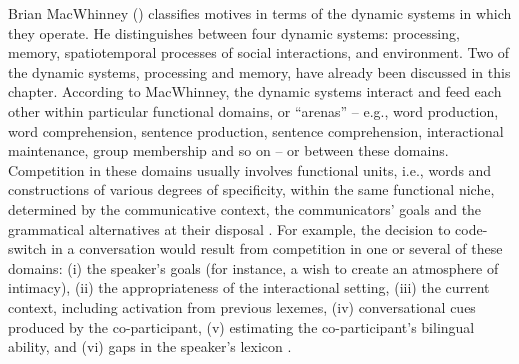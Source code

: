 Brian MacWhinney (\citeyear[][368--370]{macwhinney2014}) classifies motives in terms of the dynamic systems in which they operate. He distinguishes between four dynamic systems: processing, memory, spatiotemporal processes of social interactions, and environment. Two of the dynamic systems, processing and memory, have already been discussed in this chapter. According to MacWhinney, the dynamic systems interact and feed each other within particular functional domains, or “arenas” -- e.g., word production, word comprehension, sentence production, sentence comprehension, interactional maintenance, group membership and so on -- or between these domains. Competition in these domains usually involves functional units, i.e., words and constructions of various degrees of specificity, within the same functional niche, determined by the communicative context, the communicators' goals and the grammatical alternatives at their disposal \citep[][266]{dubois2014}. For example, the decision to code-switch in a conversation would result from competition in one or several of these domains: ({i}) the speaker's goals (for instance, a wish to create an atmosphere of intimacy), ({ii}) the appropriateness of the interactional setting, ({iii}) the current context, including activation from previous lexemes, ({iv}) conversational cues produced by the co-participant, ({v}) estimating the co-participant's bilingual ability, and ({vi}) gaps in the speaker's lexicon \citep[cf.][72]{macwhinney2005}. 

